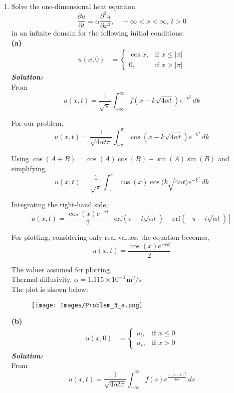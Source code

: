 \documentclass[]{article}
\theoremstyle{definition}
\begin{document}
\begin{enumerate}
\item 
Solve the one-dimensional heat equation
\[
\frac{\partial u}{\partial t} = \alpha \frac{\partial^2 u}{\partial x^2}, \quad -\infty < x < \infty, \, t > 0
\]
in an infinite domain for the following initial conditions:\\
\textbf{(a)}\quad
\begin{align*}
u(x,0) &= \begin{cases}
\cos x, & \text{if } x \leq |\pi| \\
0, & \text{if } x > |\pi|
\end{cases}
\end{align*}
\emph{\textbf{Solution:}}\\
From
\[
u(x,t) = \frac{1}{\sqrt{\pi}} \int_{-\infty}^{\infty} f(x - k\sqrt{4\alpha t}) e^{-k^2}\,dk
\]

For our problem,
\[
u(x,t) = \frac{1}{\sqrt{4\alpha t \pi}} \int_{-\pi}^{\pi} \cos(x - k\sqrt{4\alpha t}) e^{-k^2}\,dk
\]

Using $\cos(A+B) = \cos(A)\cos(B) - \sin(A)\sin(B)$ and simplifying,
\[
u(x,t) = \frac{1}{\sqrt{\pi}} \int_{-\pi}^{\pi} \cos(x)\cos(k\sqrt{4\alpha t)} e^{-k^2}\,dk
\]

Integrating the right-hand side,
\[
\boxed{
u(x,t) = \frac{\cos(x)e^{-\alpha t}}{2} \left[\text{erf}(\pi - i\sqrt{\alpha t}) - \text{erf}(-\pi - i\sqrt{\alpha t})\right]
}
\]

For plotting, considering only real values, the equation becomes,
\[
u(x,t) = \frac{\cos(x)e^{-\alpha t}}{2}
\]

The values assumed for plotting, \\
Thermal diffusivity, $\alpha = 1.115 \times 10^{-3}\, \text{m}^2/\text{s}$ \\
The plot is shown below:
\begin{figure}[htbp]
    \centering
    \texttt{[image: Images/Problem\_3\_a.png]}
\end{figure}

\textbf{(b)}\quad
\begin{align*}
u(x,0) &= \begin{cases}
u_l, & \text{if } x \leq 0 \\
u_r, & \text{if } x > 0
\end{cases}
\end{align*}
\emph{\textbf{Solution:}}\\
From
\[
u(x,t) = \frac{1}{\sqrt{4\alpha t \pi}} \int_{-\infty}^{\infty} f(s) e^{\frac{-(s-x)^2}{4\alpha t}}\,ds
\]


\end{enumerate}
\end{document}
